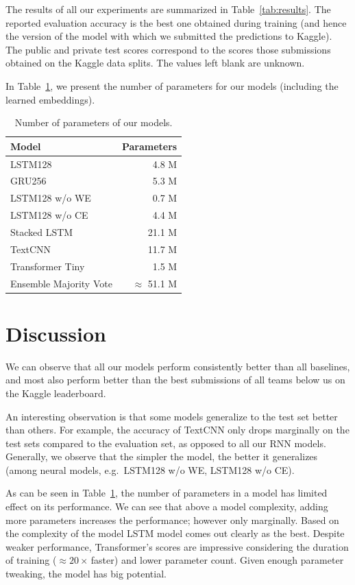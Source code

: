 \documentclass[10pt,conference,compsocconf]{IEEEtran}
\begin{document}
The results of all our experiments are summarized in Table~\ref{tab:results}. The reported evaluation accuracy is the best one obtained during training (and hence the version of the model with which we submitted the predictions to Kaggle). The public and private test scores correspond to the scores those submissions obtained on the Kaggle data splits. The values left blank are unknown.

In Table~\ref{tab:params}, we present the number of parameters for our models (including the learned embeddings).

\begin{table}\centering
\begin{tabular}{lr}
\toprule
Model & Parameters\\
\midrule
LSTM128 & 4.8 M\\
GRU256 & 5.3 M\\
LSTM128 w/o WE & 0.7 M\\
LSTM128 w/o CE & 4.4 M\\
Stacked LSTM & 21.1 M\\
TextCNN & 11.7 M\\
Transformer Tiny & 1.5 M\\
Ensemble Majority Vote & $\approx$ 51.1 M\\
\bottomrule
\end{tabular}
\caption{Number of parameters of our models.}\label{tab:params}
\end{table}

\section{Discussion}

We can observe that all our models perform consistently better than all baselines, and most also perform better than the best submissions of all teams below us on the Kaggle leaderboard.

An interesting observation is that some models generalize to the test set better than others. For example, the accuracy of TextCNN only drops marginally on the test sets compared to the evaluation set, as opposed to all our RNN models. Generally, we observe that the simpler the model, the better it generalizes (among neural models, e.g.~LSTM128 w/o WE, LSTM128 w/o CE).

As can be seen in Table~\ref{tab:params},
the number of parameters in a model has limited effect on its performance. We can see that above a model complexity, adding more parameters increases the performance; however only marginally. Based on the complexity of the model LSTM model comes out clearly as the best. Despite weaker performance, Transformer's scores are impressive considering the duration of training ($\approx 20\times$\,faster) and lower parameter count. Given enough parameter tweaking, the model has big potential.
\end{document}
